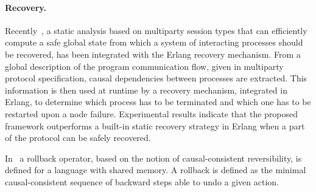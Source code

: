 \documentclass[a4paper,oneside]{article}
\begin{document}
\paragraph{Recovery.}
Recently~\cite{NY2017}, 
a static analysis based on multiparty session types that
 can efficiently compute a safe global state from which a system of interacting processes should be recovered, has been integrated with the Erlang recovery mechanism. From a global description of the program communication flow, given in multiparty protocol specification, 
  causal dependencies between processes are extracted. This information is then used at runtime by a recovery mechanism, integrated in Erlang, to determine which process has to be terminated and which one has to be restarted upon a node failure. Experimental results indicate that the proposed framework outperforms a built-in static recovery strategy in Erlang when a part of the protocol can be safely recovered. 

In~\cite{DBLP:journals/jlp/GiachinoLMT17} a rollback operator, 
 based on the notion of causal-consistent reversibility, is defined for a language with shared memory. 
  A rollback is  defined as the minimal causal-consistent sequence of backward steps able to undo a given action. 

\end{document}
